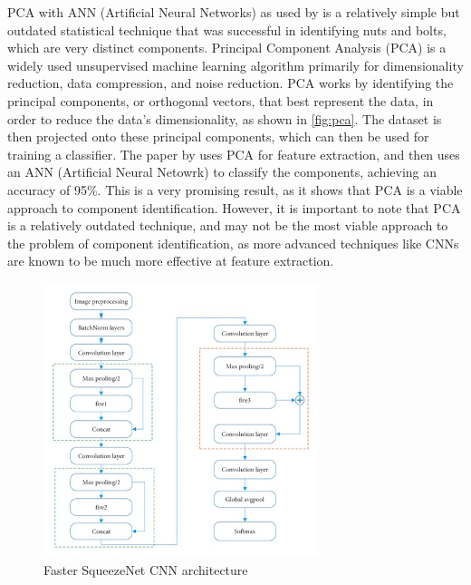 PCA with ANN (Artificial Neural Networks) as used by \citet{Dhenge2013MechanicalNS} is a relatively simple but outdated statistical technique that was successful in identifying nuts and bolts, which are very distinct components. Principal Component Analysis (PCA) is a widely used unsupervised machine learning algorithm primarily for dimensionality reduction, data compression, and noise reduction. PCA works by identifying the principal components, or orthogonal vectors, that best represent the data, in order to reduce the data's dimensionality, as shown in \autoref{fig:pca}. The dataset is then projected onto these principal components, which can then be used for training a classifier. The paper by \citet{Dhenge2013MechanicalNS} uses PCA for feature extraction, and then uses an ANN (Artificial Neural Netowrk) to classify the components, achieving an accuracy of 95\%. This is a very promising result, as it shows that PCA is a viable approach to component identification. However, it is important to note that PCA is a relatively outdated technique, and may not be the most viable approach to the problem of component identification, as more advanced techniques like CNNs are known to be much more effective at feature extraction.

\begin{figure}[H]
  \hfill
  \begin{minipage}[t]{\textwidth}
    \centering
    \includegraphics[height=8cm]{imgs/articles/squeezenet.jpg}
    \caption{Faster SqueezeNet CNN architecture \cite{Xu2020}}
    \label{fig:pca}
  \end{minipage}
\end{figure}

